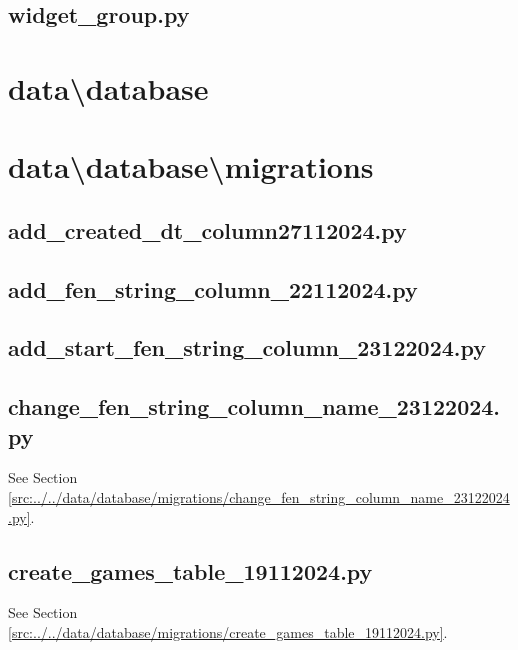 \documentclass[../main/main.tex]{subfiles}
\begin{document}
\subsection{widget\_group.py}

\label{src:data/components/widget_group.py}

\section{data\textbackslash database}
\section{data\textbackslash database\textbackslash migrations}
\subsection{add\_created\_dt\_column27112024.py}

\label{src:data/database/migrations/add_created_dt_column27112024.py}

\subsection{add\_fen\_string\_column\_22112024.py}

\label{src:data/database/migrations/add_fen_string_column_22112024.py}

\subsection{add\_start\_fen\_string\_column\_23122024.py}

\label{src:data/database/migrations/add_start_fen_string_column_23122024.py}

\subsection{change\_fen\_string\_column\_name\_23122024.py}
See Section \ref{src:../../data/database/migrations/change_fen_string_column_name_23122024.py}.

\subsection{create\_games\_table\_19112024.py}
See Section \ref{src:../../data/database/migrations/create_games_table_19112024.py}.
\end{document}
